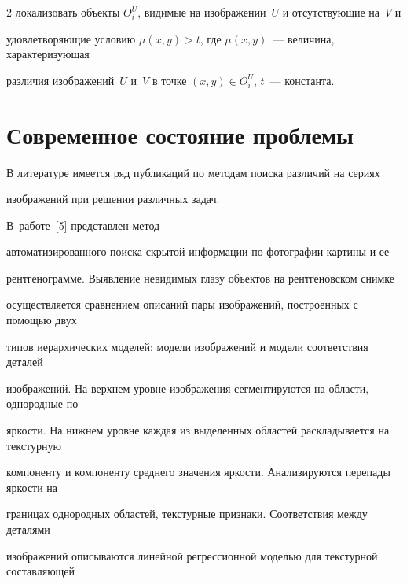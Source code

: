 \begin{multicols}{2}
локализовать объекты $O_i^U$, видимые на изображении~$U$ и от\-сут\-ст\-ву\-ющие на~$V$ и 


удовлетворяющие условию $\mu(x,y)>t$, где $\mu(x,y)$~--- величина, характеризующая 


различия изображений~$U$ и~$V$ в точке $(x,y)\in O_i^U$, $t$~--- константа.










\section{Современное состояние проблемы}










  В литературе имеется ряд публикаций по методам поиска различий на сериях 


изображений при решении различных задач. 





В~работе~[5] представлен метод 


автоматизированного поиска скрытой информации по фотографии картины и ее 


рентгенограмме. Выявление невидимых глазу объектов на рентгеновском снимке 


осуществляется сравнением описаний пары изображений, построенных с помощью двух 


типов иерархических моделей: модели изображений и модели соответствия деталей 


изображений. На верхнем уровне изображения сегментируются на области, однородные по 


яркости. На нижнем уровне каждая из выделенных областей раскладывается на текстурную 


компоненту и компоненту среднего значения яркости. Анализируются перепады яр\-кости на 


границах однородных областей, текстурные признаки. Соответствия между деталями 


изображений описываются линейной регрессионной моделью для текстурной составляющей 



\end{multicols}
